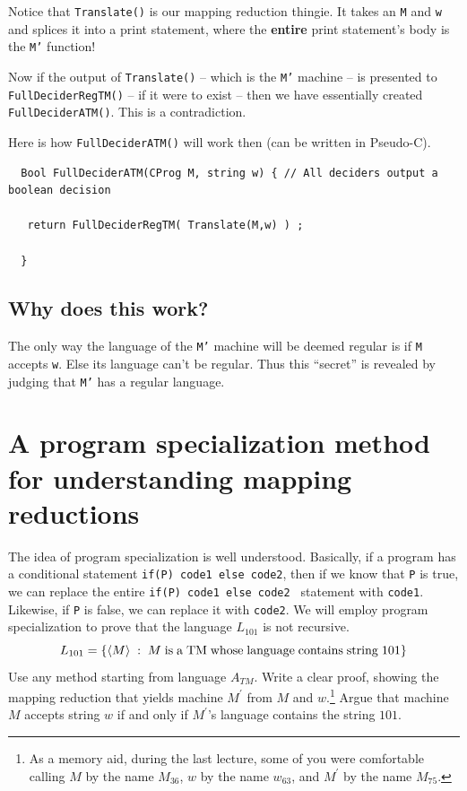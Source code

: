\documentclass[10pt]{article}
\begin{document}
Notice that {\tt Translate()} is our mapping reduction thingie. It takes
an {\tt M} and {\tt w} and splices it into a print statement, where the
{\bf entire} print statement's body is the {\tt M'} function!

Now if the output of {\tt Translate()} -- which is the {\tt M'} machine -- is presented
to {\tt  FullDeciderRegTM()} -- if it were to exist -- then
we have essentially created
{\tt FullDeciderATM()}. This is a contradiction.

Here is how {\tt FullDeciderATM()} will work then (can be written in Pseudo-C).


\begin{footnotesize}
\begin{verbatim}
  Bool FullDeciderATM(CProg M, string w) { // All deciders output a boolean decision

   return FullDeciderRegTM( Translate(M,w) ) ;

  }
\end{verbatim}
\end{footnotesize}

\subsection{Why does this work?}

The only way the language of the {\tt M'} machine will be deemed regular is
if {\tt M} accepts {\tt w}. Else its language can't be regular. Thus this
``secret'' is revealed by judging that {\tt M'} has a regular language.


\section{A program specialization method for understanding mapping reductions}

\noindent The idea of program specialization is well understood.
%
Basically, if a program has a conditional statement {\tt if(P) {code1} else {code2}}, then if
we know that {\tt P} is true, we can replace the entire
{\tt if(P) {code1} else {code2} } statement with {\tt code1}.
%
Likewise, if {\tt P} is false, we can replace it with {\tt code2}.
%
We will employ program specialization to prove that the language $L_{101}$ is not recursive.
%
%
\[ L_{101} = \{ \langle M\rangle \;:\;
M
\; {\rm is}
\; {\rm a}
\; {\rm TM}
\; {\rm whose}
\; {\rm language}
\; {\rm contains}
\; {\rm string}
\; 101\}
\]
%
Use any method starting from language $A_{TM}$.
%
Write a clear proof, showing the mapping reduction that yields
machine $M^{'}$
from $M$ and $w$.\footnote{As a memory aid, during the last lecture,
some of you were comfortable calling $M$ by the name $M_{36}$,
$w$ by the name $w_{63}$, and $M^{'}$ by the name $M_{75}$.}
%
Argue that machine $M$ accepts string $w$ if and only if $M^{'}$'s
language contains the string $101$.
\end{document}
